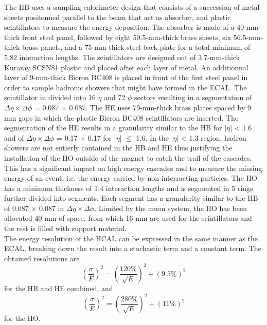     The HB uses a sampling calorimeter design that consists of a succession of metal sheets positonned parallel to the beam that act as absorber, and plastic scintillators to measure the energy deposition. The absorber is made of a 40-mm-thick front steel panel, followed by eight 50.5-mm-thick brass sheets, six 56.5-mm-thick brass panels, and a 75-mm-thick steel back plate for a total minimum of 5.82 interaction lengths. The scintillators are designed out of 3.7-mm-thick Kuraray SCSN81 plastic and placed after each layer of metal. An additionnal layer of 9-mm-thick Bicron BC408 is placed in front of the first steel panel in order to sample hadronic showers that might have formed in the ECAL. The scintillator in divided into 16 $ \eta $ and 72 $ \phi $ sectors resulting in a segmentation of $ \Delta \eta \times \Delta \phi $ = 0.087 $ \times $ 0.087. The HE uses 79-mm-thick brass plates spaced by 9 mm gaps in which the plastic Bicron BC408 scintillators are inserted. The segmentation of the HE results in a granularity similar to the HB for $ | \eta | $ < 1.6 and of $ \Delta \eta \times \Delta \phi $ = 0.17 $ \times $ 0.17 for $ | \eta | $ $ \le $ 1.6. In the $ | \eta | $ < 1.3 region, hadron showers are not entierly contained in the HB and HE thus justifying the installation of the HO outside of the magnet to catch the trail of the cascades. This has a significant impact on high energy cascades and to measure the missing energy of an event, i.e. the energy carried by non-interracting particles. The HO has a minimum thickness of 1.4 interaction lengths and is segmented in 5 rings further divided into segments. Each segment has a granularity similar to the HB of 0.087 $ \times $ 0.087 in $ \Delta \eta \times \Delta \phi $. Limited by the muon system, the HO has been allocated 40 mm of space, from which 16 mm are used for the scintillators and the rest is filled with support material. \\

    The energy resolution of the HCAL can be expressed in the same manner as the ECAL, breaking down the result into a stochastic term and a constant term. The obtained resolutions \cite{Baiatian:1049929} are
    \begin{equation}
      \left( \frac{\sigma}{E} \right)^2 = \left( \frac{120\%}{\sqrt{E}} \right)^2 + (9.5\%)^2
    \end{equation}
    for the HB and HE combined, and
    \begin{equation}
      \left( \frac{\sigma}{E} \right)^2 = \left( \frac{280\%}{\sqrt{E}} \right)^2 + (11\%)^2
    \end{equation}
    for the HO.

